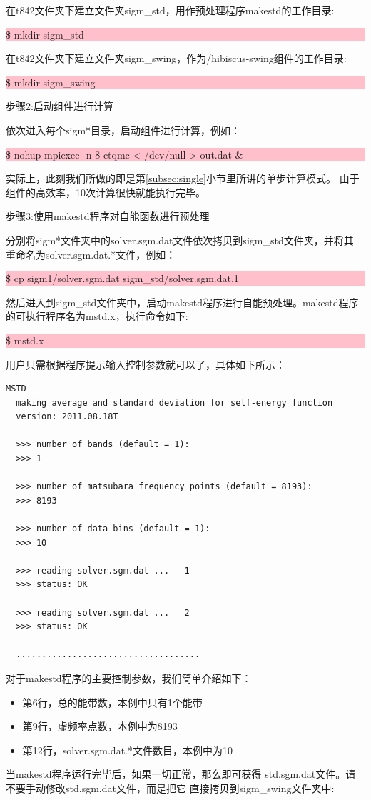 在t842文件夹下建立文件夹sigm\_std，用作预处理程序makestd的工作目录:

\noindent\colorbox{pink}{\parbox[r]{\linewidth}{\quad \$ mkdir sigm\_std }}

在t842文件夹下建立文件夹sigm\_swing，作为{\hibiscus}/hibiscus-swing组件的工作目录:

\noindent\colorbox{pink}{\parbox[r]{\linewidth}{\quad \$ mkdir sigm\_swing }}

步骤2:\underline{启动\azalea 组件进行计算}

依次进入每个sigm*目录，启动\azalea 组件进行计算，例如：

\noindent\colorbox{pink}{\parbox[r]{\linewidth}{\quad \$ nohup mpiexec -n 8 ctqmc < /dev/null > out.dat \& }}

实际上，此刻我们所做的即是第\ref{subsec:single}小节里所讲的单步计算模式。
由于{\azalea}组件的高效率，10次计算很快就能执行完毕。

步骤3:\underline{使用makestd程序对自能函数进行预处理}

分别将sigm*文件夹中的solver.sgm.dat文件依次拷贝到sigm\_std文件夹，并将其
重命名为solver.sgm.dat.*文件，例如：

\noindent\colorbox{pink}{\parbox[r]{\linewidth}{\quad \$ cp sigm1/solver.sgm.dat  sigm\_std/solver.sgm.dat.1 }}

然后进入到sigm\_std文件夹中，启动makestd程序进行自能预处理。makestd程序
的可执行程序名为mstd.x，执行命令如下:

\noindent\colorbox{pink}{\parbox[r]{\linewidth}{\quad \$ mstd.x }}

用户只需根据程序提示输入控制参数就可以了，具体如下所示：
\begin{lstlisting}[frame=single]
  MSTD
  making average and standard deviation for self-energy function
  version: 2011.08.18T
 
  >>> number of bands (default = 1):
  >>> 1
 
  >>> number of matsubara frequency points (default = 8193):
  >>> 8193
 
  >>> number of data bins (default = 1):
  >>> 10
 
  >>> reading solver.sgm.dat ...   1
  >>> status: OK
 
  >>> reading solver.sgm.dat ...   2
  >>> status: OK

  ....................................

\end{lstlisting}
对于makestd程序的主要控制参数，我们简单介绍如下：
\begin{itemize}
  \item 第6行，总的能带数，本例中只有1个能带
  \item 第9行，虚频率点数，本例中为8193
  \item 第12行，solver.sgm.dat.*文件数目，本例中为10
\end{itemize}
当makestd程序运行完毕后，如果一切正常，那么即可获得
std.sgm.dat文件。请不要手动修改std.sgm.dat文件，而是把它
直接拷贝到sigm\_swing文件夹中:

